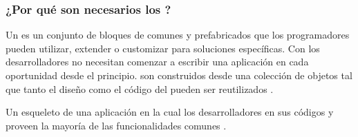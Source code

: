 


\subsubsection{ ¿Por qué son necesarios los \frameworksPC?}

Un \frameworkPC es un conjunto de bloques de \softwarePC comunes y prefabricados que los programadores pueden utilizar, extender o customizar para soluciones específicas. Con  \frameworksPC los desarrolladores no necesitan comenzar a escribir una aplicación en cada oportunidad desde el principio. \frameworksPC son construidos desde una colección de objetos tal que tanto el diseño como el código del \frameworkPC pueden ser reutilizados \cite{online_frontier_what_is_framework}.

Un esqueleto de una aplicación en la cual los desarrolladores \plugAS en sus códigos y proveen la mayoría de las funcionalidades comunes \cite{book_addisonwesley_what_is_framework}.

%
%
%


